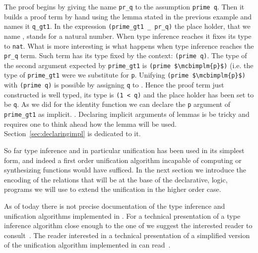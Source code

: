 The proof begins by giving the name \lstinline/pr_q/ to the assumption
\lstinline/prime q/.  Then it builds a proof term by hand using
the lemma stated in the previous example and names it \lstinline/q_gt1/.
In the expression \lstinline/(prime_gt1 _ pr_q)/ the place holder,
that we name , stands for a natural number.
When type inference reaches  it fixes its type to \lstinline/nat/.
What is more interesting is what happens when type inference reaches the
\lstinline/pr_q/ term.  Such term has its type fixed by the context:
\lstinline/(prime q)/.  The type of the second argument expected by
\lstinline/prime_gt1/ is \lstinline/(prime $\mcbimplm{p}$)/ (i.e. the
type of \lstinline/prime_gt1/ were we substitute  for
\lstinline/p/.  Unifying \lstinline/(prime $\mcbimplm{p}$)/ with
\lstinline/(prime q)/ is possible by assigning \lstinline/q/ to
.  Hence the proof term just constructed is
well typed, its type is \lstinline/(1 < q)/ and the place holder
has been set to be \lstinline{q}.
As we did for the identity function we can declare the \lstinline/p/
argument of \lstinline/prime_gt1/ as implicit.  .
Declaring implicit arguments of lemmas is be tricky and requires one
to think ahead how the lemma will be used.
Section~\ref{sec:declaringimpl} is dedicated to it.

So far type inference and in particular unification has been used in
its simplest form, and indeed a first order unification algorithm
incapable of computing or synthesizing functions would have sufficed.
In the next section we introduce the encoding of the relations that
will be at the base of the declarative, logic, programs we will use to
extend the unification in the higher order case.

As of today there is not precise documentation of the type inference
and unification algorithms implemented in \Coq{}.  For a technical
presentation of a type inference algorithm close enough to the one
of \Coq{} we suggest the interested reader to
consult~\cite{DBLP:journals/corr/abs-1202-4905}.  The reader
interested in a technical presentation of a simplified version of the
unification algorithm implemented in \Coq{} can
read~\cite{unifcoq,betaderekjournal}.

\mcbREQUIRE{}
\mcbNOTES{}

